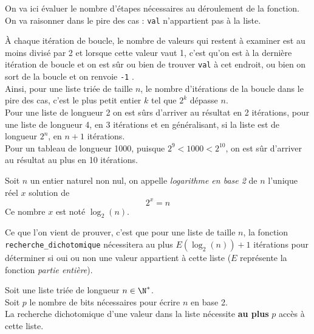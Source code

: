 On va ici évaluer le nombre d'étapes nécessaires au déroulement de la fonction. On va raisonner dans le pire des cas : \texttt{val} n'appartient pas à la liste.

À chaque itération de boucle, le nombre de valeurs qui restent à examiner est au moins divisé par 2 et lorsque  cette valeur vaut 1, c'est qu'on est à la dernière itération de boucle et on est sûr ou bien de trouver \texttt{val} à cet endroit, ou bien on sort de la boucle et on renvoie \texttt{-1} .\\

Ainsi, pour une liste triée de taille $n$, le nombre d'itérations de la boucle dans le pire des cas, c'est le plus petit entier $k$ tel que $2^k$ dépasse $n$.\\

Pour une liste de longueur 2 on est sûrs d'arriver au résultat en 2 itérations, pour une liste de longueur 4, en 3 itérations et en généralisant, si la liste est de longueur $2^n$, en $n+1$ itérations.\\

Pour un tableau de longueur 1000, puisque $2^9<1000<2^{10}$, on est sûr d'arriver au résultat au plus en 10 itérations.\\

\begin{definition}[]
	Soit $n$ un entier naturel non nul, on appelle \textit{logarithme en base 2} de $n$ l'unique réel $x$ solution de $$2^x=n$$
	Ce nombre $x$ est noté $\log_2(n)$.

\end{definition}

Ce que l'on vient de prouver, c'est que pour une liste de taille $n$, la fonction\\
\texttt{recherche_dichotomique} nécessitera au plus $E (\log_2(n))+1$ itérations pour déterminer si oui ou non une valeur appartient à cette liste ($E$ représente la fonction \textit{partie entière}).\\

\begin{propriete}
	Soit une liste triée de longueur $n\in\N^*$.\\
	Soit $p$ le nombre de bits nécessaires pour écrire $n$ en base 2.\\

	La recherche dichotomique d'une valeur dans la liste nécessite \textbf{au plus} $p$ accès à cette liste.
\end{propriete}

